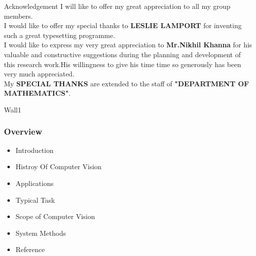 \documentclass{beamer}
\begin{document}
{
	\begin{frame}{Acknowledgement}
	I will like to offer my great appreciation to all my group members.\\I would like to offer my special thanks to \textbf{LESLIE LAMPORT} for inventing such a great typesetting programme.\\ I would like to express my very great appreciation to \textbf{Mr.Nikhil Khanna} for his valuable and constructive suggestions during the planning and development of this research work.His willingness to give his time time so generously has been very much appreciated.\\
	My \textbf{SPECIAL THANKS} are extended to the staff of \textbf{"DEPARTMENT OF MATHEMATICS"}.
\end{frame}
{
	
	\begin{frame}{Wall1}
	\frametitle{Overview}
	\begin{itemize}
		\item Introduction
		\item Histroy Of Computer Vision
		\item Applications
		\item Typical Task
		\item Scope of Computer Vision
		\item System Methods
		\item Reference
	\end{itemize}
\end{frame}
}

}
\end{document}
